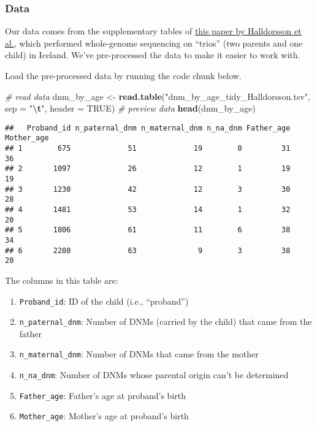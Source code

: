 \documentclass[
]{article}
\newenvironment{Shaded}{\begin{snugshade}}{\end{snugshade}}
\newcommand{\AttributeTok}[1]{\textcolor[rgb]{0.13,0.29,0.53}{#1}}
\newcommand{\CommentTok}[1]{\textcolor[rgb]{0.56,0.35,0.01}{\textit{#1}}}
\newcommand{\ConstantTok}[1]{\textcolor[rgb]{0.56,0.35,0.01}{#1}}
\newcommand{\FunctionTok}[1]{\textcolor[rgb]{0.13,0.29,0.53}{\textbf{#1}}}
\newcommand{\NormalTok}[1]{#1}
\newcommand{\OtherTok}[1]{\textcolor[rgb]{0.56,0.35,0.01}{#1}}
\newcommand{\SpecialCharTok}[1]{\textcolor[rgb]{0.81,0.36,0.00}{\textbf{#1}}}
\newcommand{\StringTok}[1]{\textcolor[rgb]{0.31,0.60,0.02}{#1}}
\providecommand{\tightlist}{%
  \setlength{\itemsep}{0pt}\setlength{\parskip}{0pt}}
\begin{document}
\subsubsection{Data}\label{data}

Our data comes from the supplementary tables of
\href{https://science.sciencemag.org/content/363/6425/eaau1043}{this
paper by Halldorsson et al.}, which performed whole-genome sequencing on
``trios'' (two parents and one child) in Iceland. We've pre-processed
the data to make it easier to work with.

Load the pre-processed data by running the code chunk below.

\begin{Shaded}
\begin{Highlighting}[]
\CommentTok{\# read data}
\NormalTok{dnm\_by\_age }\OtherTok{\textless{}{-}} \FunctionTok{read.table}\NormalTok{(}\StringTok{"dnm\_by\_age\_tidy\_Halldorsson.tsv"}\NormalTok{,}
                         \AttributeTok{sep =} \StringTok{"}\SpecialCharTok{\textbackslash{}t}\StringTok{"}\NormalTok{, }\AttributeTok{header =} \ConstantTok{TRUE}\NormalTok{)}
\CommentTok{\# preview data}
\FunctionTok{head}\NormalTok{(dnm\_by\_age)}
\end{Highlighting}
\end{Shaded}

\begin{verbatim}
##   Proband_id n_paternal_dnm n_maternal_dnm n_na_dnm Father_age Mother_age
## 1        675             51             19        0         31         36
## 2       1097             26             12        1         19         19
## 3       1230             42             12        3         30         28
## 4       1481             53             14        1         32         20
## 5       1806             61             11        6         38         34
## 6       2280             63              9        3         38         20
\end{verbatim}

The columns in this table are:

\begin{enumerate}
\def\labelenumi{\arabic{enumi}.}
\tightlist
\item
  \texttt{Proband\_id}: ID of the child (i.e., ``proband'')
\item
  \texttt{n\_paternal\_dnm}: Number of DNMs (carried by the child) that
  came from the father
\item
  \texttt{n\_maternal\_dnm}: Number of DNMs that came from the mother
\item
  \texttt{n\_na\_dnm}: Number of DNMs whose parental origin can't be
  determined
\item
  \texttt{Father\_age}: Father's age at proband's birth
\item
  \texttt{Mother\_age}: Mother's age at proband's birth
\end{enumerate}
\end{document}
